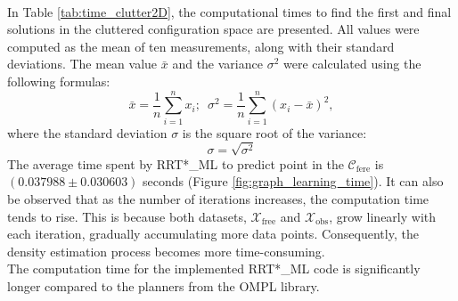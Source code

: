 \documentclass{ctuthesis}
\begin{document}
\\
In Table \ref{tab:time_clutter2D}, 
the computational times to find the first and final solutions in the cluttered configuration space 
are presented. 
All values were computed as the mean of ten measurements, 
along with their standard deviations. 
The mean value $\bar{x}$ and the variance $\sigma^2$ were calculated using the following formulas:
\[
\bar{x} = \frac{1}{n} \sum_{i=1}^{n} x_i; \enspace \sigma^2 = \frac{1}{n} \sum_{i=1}^{n} (x_i - \bar{x})^2, 
\]
where the standard deviation $\sigma$ is the square root of the variance:
\[
\sigma = \sqrt{\sigma^2}
\] 
The average time spent by RRT*\_ML to predict point in the $\mathcal{C}_\text{fere}$ 
is $(0.037988 \pm 0.030603)$ seconds (Figure \ref{fig:graph_learning_time}). 
It can also be observed that as the number of iterations increases, 
the computation time tends to rise. 
This is because both datasets, \( \mathcal{X}_{\text{free}} \) and \( \mathcal{X}_{\text{obs}} \), 
grow linearly with each iteration, 
gradually accumulating more data points. 
Consequently, the density estimation process becomes more time-consuming.
\\[12pt]
The computation time for the implemented RRT*\_ML code is significantly longer 
compared to the planners from the OMPL library. 

\end{document}
